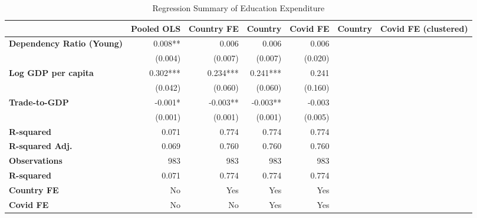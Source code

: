 \begin{table}
\caption{Regression Summary of Education Expenditure}
\label{tab4}
\begin{tabular}{lrrrr}
\toprule
 & Pooled OLS & Country FE & Country & Covid FE & Country & Covid FE (clustered) \\
\midrule
\textbf{Dependency Ratio (Young)} & 0.008** & 0.006 & 0.006 & 0.006 \\
\textbf{} & (0.004) & (0.007) & (0.007) & (0.020) \\
\textbf{Log GDP per capita} & 0.302*** & 0.234*** & 0.241*** & 0.241 \\
\textbf{} & (0.042) & (0.060) & (0.060) & (0.160) \\
\textbf{Trade-to-GDP} & -0.001* & -0.003** & -0.003** & -0.003 \\
\textbf{} & (0.001) & (0.001) & (0.001) & (0.005) \\
\textbf{R-squared} & 0.071 & 0.774 & 0.774 & 0.774 \\
\textbf{R-squared Adj.} & 0.069 & 0.760 & 0.760 & 0.760 \\
\textbf{Observations} & 983 & 983 & 983 & 983 \\
\textbf{R-squared} & 0.071 & 0.774 & 0.774 & 0.774 \\
\textbf{Country FE} & No & Yes & Yes & Yes \\
\textbf{Covid FE} & No & No & Yes & Yes \\
\bottomrule
\end{tabular}
\end{table}
